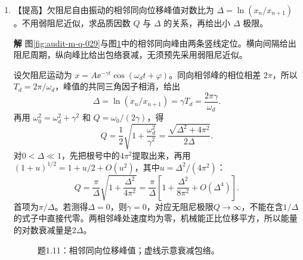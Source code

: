 \documentclass[11pt,openany,fontset=fandol]{ctexbook}
\theoremstyle{plain}\newtheorem{theorem}{定理}[chapter]\newtheorem{proposition}[theorem]{命题}
\theoremstyle{definition}\newtheorem{definition}{定义}[chapter]\newtheorem{example}{例}[chapter]
\theoremstyle{remark}\newtheorem*{remark}{说明}
\newcommand{\SolutionStart}{\par\nobreak\medskip\nobreak\noindent\textbf{解}\quad\ignorespaces}
\newenvironment{solution}{\SolutionStart}{\par\medskip}
\begin{document}
\begin{enumerate}[label=1.\arabic*]
\begin{solution}
原圆上的 $z=0$ 不在变换定义域中；沿圆趋近该点时 $|w|=1/|z|\to\infty$。所以像为整条直线 $\Rea w=1/2$。

图中 $2\mapsto1/2$、$1+\ii\mapsto(1-\ii)/2$，两像都落在所得直线上，是代数结果的直接检验。
\end{solution}

\item \begin{minipage}[t]{\linewidth}
【提高】欠阻尼自由振动的相邻同向位移峰值对数比为 $\Delta=\ln(x_n/x_{n+1})$。不用弱阻尼近似，求品质因数 $Q$ 与 $\Delta$ 的关系，再给出小 $\Delta$ 极限。

\end{minipage}

\begin{solution}
图\ref{fig:audit-m-q-029}与图\ref{fig:ex-1-11}中的相邻同向峰由两条竖线定位。横向间隔给出阻尼周期，纵向峰比给出包络衰减，无须预先采用弱阻尼近似。

设欠阻尼运动为 $x=A\ee^{-\gamma t}\cos(\omega_dt+\varphi)$。同向相邻峰的相位相差 $2\pi$，所以 $T_d=2\pi/\omega_d$，峰值的共同三角因子相消，给出
\[
\Delta=\ln(x_n/x_{n+1})=\gamma T_d
=\frac{2\pi\gamma}{\omega_d}.
\]
再用 $\omega_0^2=\omega_d^2+\gamma^2$ 和 $Q=\omega_0/(2\gamma)$，得
\[
Q=\frac12\sqrt{1+\frac{\omega_d^2}{\gamma^2}}
=\frac{\sqrt{\Delta^2+4\pi^2}}{2\Delta}.
\]
对$0<\Delta\ll1$，先把根号中的$4\pi^2$提取出来，再用
$(1+u)^{1/2}=1+u/2+O(u^2)$，其中$u=\Delta^2/(4\pi^2)$：
\[
Q=\frac\pi\Delta\sqrt{1+\frac{\Delta^2}{4\pi^2}}
=\frac\pi\Delta\left[1+\frac{\Delta^2}{8\pi^2}
+O(\Delta^4)\right].
\]
首项为$\pi/\Delta$。若测得$\Delta=0$，则$\gamma=0$，对应无阻尼极限$Q\to\infty$，不能在含$1/\Delta$的式子中直接代零。两相邻峰处速度均为零，机械能正比位移平方，所以能量的对数衰减量是$2\Delta$。

\begin{figure}[H]\centering
{}
\caption{题1.11：相邻同向位移峰值；虚线示意衰减包络。}\label{fig:ex-1-11}
\end{figure}


\end{solution}
\end{enumerate}
\end{document}
